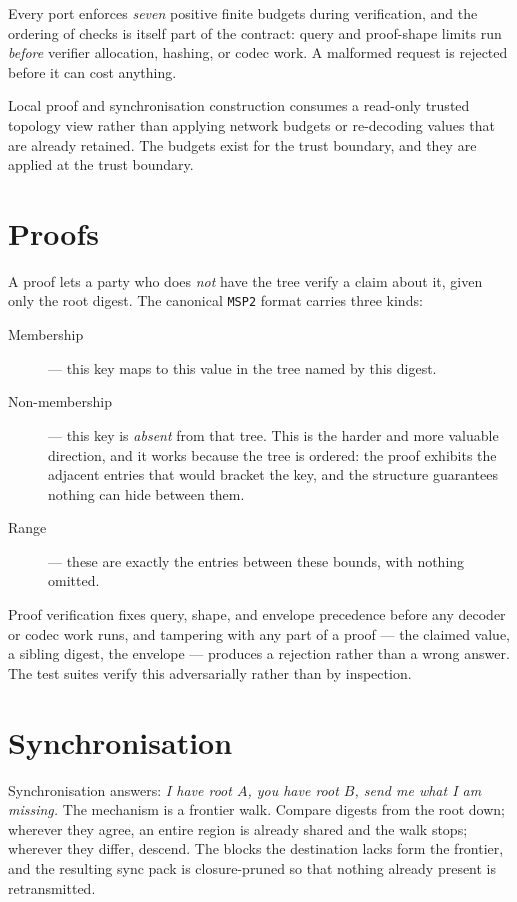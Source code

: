 \documentclass[11pt,twoside,openright]{book}
\newcommand{\code}[1]{\texorpdfstring{\textcolor{d7ink}{\texttt{#1}}}{#1}}
\begin{document}
\begin{contractbox}
Every port enforces \emph{seven} positive finite budgets during verification, and
the ordering of checks is itself part of the contract: query and proof-shape
limits run \emph{before} verifier allocation, hashing, or codec work. A malformed
request is rejected before it can cost anything.

Local proof and synchronisation construction consumes a read-only trusted
topology view rather than applying network budgets or re-decoding values that are
already retained. The budgets exist for the trust boundary, and they are applied
at the trust boundary.
\end{contractbox}

\section{Proofs}

A proof lets a party who does \emph{not} have the tree verify a claim about it,
given only the root digest. The canonical \code{MSP2} format carries three kinds:

\begin{description}
\item[Membership] --- this key maps to this value in the tree named by this
digest.
\item[Non-membership] --- this key is \emph{absent} from that tree. This is the
harder and more valuable direction, and it works because the tree is ordered: the
proof exhibits the adjacent entries that would bracket the key, and the structure
guarantees nothing can hide between them.
\item[Range] --- these are exactly the entries between these bounds, with
nothing omitted.
\end{description}

Proof verification fixes query, shape, and envelope precedence before any decoder
or codec work runs, and tampering with any part of a proof --- the claimed value,
a sibling digest, the envelope --- produces a rejection rather than a wrong
answer. The test suites verify this adversarially rather than by inspection.

\section{Synchronisation}

Synchronisation answers: \emph{I have root $A$, you have root $B$, send me what I
am missing.} The mechanism is a frontier walk. Compare digests from the root
down; wherever they agree, an entire region is already shared and the walk stops;
wherever they differ, descend. The blocks the destination lacks form the
frontier, and the resulting sync pack is closure-pruned so that nothing already
present is retransmitted.
\end{document}
